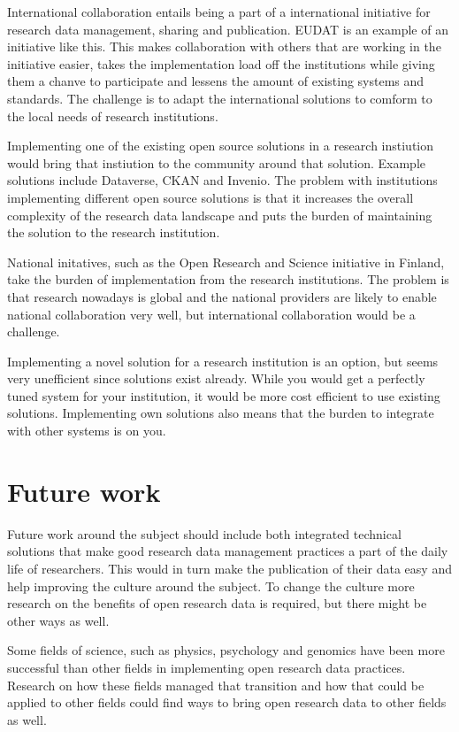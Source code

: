 International collaboration entails being a part of a international initiative
for research data management, sharing and publication. EUDAT is an example of
an initiative like this. This makes collaboration with others that are working
in the initiative easier, takes the implementation load off the institutions
while giving them a chanve to participate and lessens the amount of existing
systems and standards. The challenge is to adapt the international solutions
to comform to the local needs of research institutions.

Implementing one of the existing open source solutions in a research
instiution would bring that instiution to the community around that solution.
Example solutions include Dataverse, CKAN and Invenio. The problem with institutions
implementing different open source solutions is that it increases the overall
complexity of the research data landscape and puts the burden of maintaining
the solution to the research institution.

National initatives, such as the Open Research and Science initiative in Finland,
take the burden of implementation from the research institutions. The problem is that
research nowadays is global and the national providers are likely to enable national
collaboration very well, but international collaboration would be a challenge.

Implementing a novel solution for a research institution is an option, but seems
very unefficient since solutions exist already. While you would get a perfectly
tuned system for your institution, it would be more cost efficient to use existing
solutions. Implementing own solutions also means that the burden to integrate with
other systems is on you.

\section{Future work}

Future work around the subject should include both integrated
technical solutions that make good research data management practices a part of the
daily life of researchers. This would in turn make the publication of their data easy
and help improving the culture around the subject.
To change the culture more research on the benefits of open research data
is required, but there might be other ways as well.

Some fields of science, such as physics, psychology and genomics have been
more successful than other fields in implementing open research data practices.
Research on how these fields managed that transition and how that could be applied
to other fields could find ways to bring open research data to other
fields as well.


